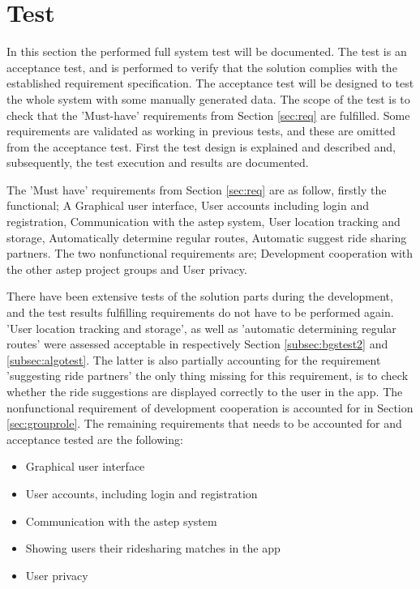 \section{Test}\label{sec:s4test}
In this section the performed full system test will be documented.
The test is an acceptance test, and is performed to verify that the solution complies with the established requirement specification.
The acceptance test will be designed to test the whole system with some manually generated data.
The scope of the test is to check that the 'Must-have' requirements from Section \ref{sec:req} are fulfilled.
Some requirements are validated as working in previous tests, and these are omitted from the acceptance test. 
First the test design is explained and described and, subsequently, the test execution and results are documented.

The 'Must have' requirements from Section \ref{sec:req} are as follow, firstly the functional; A Graphical user interface, User accounts including login and registration, Communication with the \gls{astep} system, User location tracking and storage, Automatically determine regular routes, Automatic suggest ride sharing partners. The two nonfunctional requirements are; Development cooperation with the other \gls{astep} project groups and User privacy.

There have been extensive tests of the solution parts during the development, and the test results fulfilling requirements do not have to be performed again.
'User location tracking and storage', as well as 'automatic determining regular routes' were assessed acceptable in respectively Section \ref{subsec:bgstest2} and \ref{subsec:algotest}.
The latter is also partially accounting for the requirement 'suggesting ride partners' the only thing missing for this requirement, is to check whether the ride suggestions are displayed correctly to the user in the app. 
The nonfunctional requirement of development cooperation is accounted for in Section \ref{sec:grouprole}. 
The remaining requirements that needs to be accounted for and acceptance tested are the following:
\begin{itemize}
	\item Graphical user interface
	\item User accounts, including login and registration
	\item Communication with the \gls{astep} system
	\item Showing users their ridesharing matches in the app
	\item User privacy
\end{itemize}

